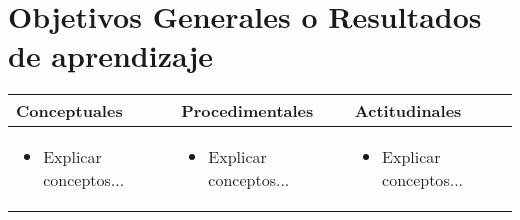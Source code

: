\section{Objetivos Generales o Resultados de aprendizaje}

\begin{tabularx}{\textwidth}{X@{} X@{} X@{}}
    \toprule
    \textbf{Conceptuales}                & \textbf{Procedimentales} & \textbf{Actitudinales} \\
    \midrule
    \begin{itemize}[nosep, leftmargin=*]
        \item Explicar conceptos...
    \end{itemize} &
    \begin{itemize}[nosep, leftmargin=*]
        \item Explicar conceptos...
    \end{itemize} &
    \begin{itemize}[nosep, leftmargin=*]
        \item Explicar conceptos...
    \end{itemize}                                                      \\
    \bottomrule
\end{tabularx}

\pagebreak